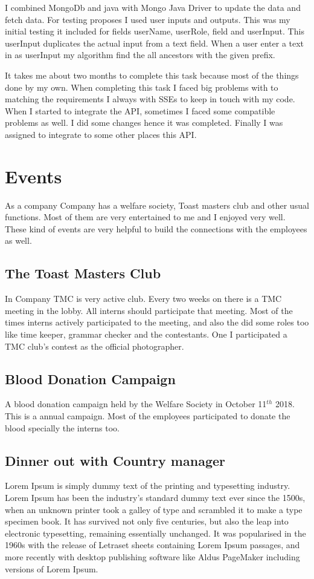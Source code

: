 \documentclass[12pt,a4paper]{report}
\begin{document}
I combined MongoDb and java with Mongo Java Driver to update the data and fetch data. For testing proposes I used user inputs and outputs. This was my initial testing it included for fields userName, userRole, field and userInput. This userInput duplicates the actual input from a text field. When a user enter a text in as userInput my algorithm find the all ancestors with the given prefix.

It takes me about two months to complete this task because most of the things done by my own. When completing this task I faced big problems with to matching the requirements I always with SSEs to keep in touch with my code. When I started to integrate the API, sometimes I faced some compatible problems as well. I did some changes hence it was completed. Finally I was assigned to integrate to some other places this API.

\newpage
\section{Events}

As a company Company has a welfare society, Toast masters club and other usual functions. Most of them are very entertained to me and I enjoyed very well. These kind of events are very helpful to build the connections with the employees as well.

\subsection*{The Toast Masters Club}

In Company TMC is very active club. Every two weeks on there is a TMC meeting in the lobby. All interns should participate that meeting. Most of the times interns actively participated to the meeting, and also the did some  roles too like time keeper, grammar checker and the contestants. One I participated a TMC club's contest as the official photographer.

\subsection*{Blood Donation Campaign}
A blood donation campaign held by the Welfare Society in October 11$^{th}$ 2018. This is a annual campaign. Most of the employees participated to donate the blood specially the interns too. 


\subsection*{Dinner out with Country manager}
Lorem Ipsum is simply dummy text of the printing and typesetting industry. Lorem Ipsum has been the industry's standard dummy text ever since the 1500s, when an unknown printer took a galley of type and scrambled it to make a type specimen book. It has survived not only five centuries, but also the leap into electronic typesetting, remaining essentially unchanged. It was popularised in the 1960s with the release of Letraset sheets containing Lorem Ipsum passages, and more recently with desktop publishing software like Aldus PageMaker including versions of Lorem Ipsum.
\end{document}
